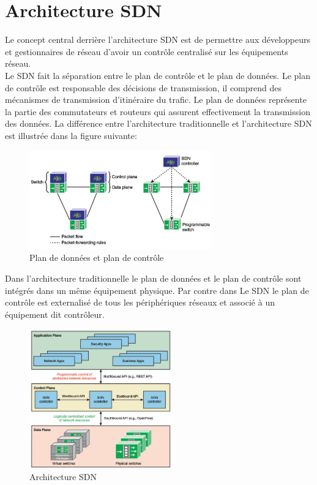 
\section{Architecture SDN}

Le concept central derrière l’architecture SDN est de permettre aux développeurs et gestionnaires de réseau d’avoir un contrôle centralisé sur les équipements réseau.\\

Le SDN fait la séparation entre le plan de contrôle et le plan de données. Le plan de contrôle est responsable des décisions de transmission, il comprend des mécanismes de transmission d’itinéraire du trafic. Le plan de données représente la partie des commutateurs et routeurs qui assurent effectivement la transmission des données. La différence entre l’architecture traditionnelle  et l’architecture SDN est illustrée dans la figure suivante:

\newpage
\begin{figure}[h]
\centering
\includegraphics[width=0.7\textwidth]{Figures/SDN_Architecture}
\decoRule
\caption{Plan de données et plan de contrôle}
\label{fig:SDN_Architecture}
\end{figure}

Dans l’architecture traditionnelle le plan de données et le plan de contrôle sont intégrés dans un même équipement physique. Par contre dans Le SDN le plan de contrôle est externalisé de tous les périphériques réseaux et associé à un équipement dit contrôleur.

\begin{figure}[h]
\centering
\includegraphics[width=0.55\textwidth]{Figures/SDN_Plans}
\decoRule
\caption{Architecture SDN}
\label{fig:SDN_Plans}
\end{figure}

